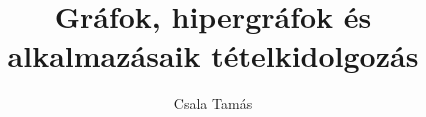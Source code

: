 \newcommand*{\authortext}{Szerző}
\newcommand*{\authorname}{Csala Tamás}

\newcommand*{\lecturer}{Előadó}
\newcommand*{\lectureri}{Dr.~Simonyi Gábor}

\newcommand*{\semester}{2016/2017.~tavaszi félév}

\title{Gráfok, hipergráfok és alkalmazásaik tételkidolgozás}
\newcommand*{\titlepagetitle}{Gráfok, hipergráfok\\és alkalmazásaik\\tételkidolgozás}
\author{\authorname}


